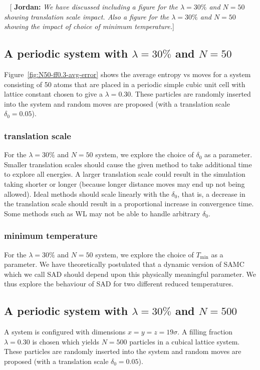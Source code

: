 \documentclass[letterpaper,twocolumn,amsmath,amssymb,pre,aps,10pt]{revtex4-1}
\newcommand{\blue}[1]{{\bf \color{blue} #1}}
\newcommand{\jpsays}[1]{{\color{red} [\blue{Jordan:} \emph{#1}]}}
\begin{document}
~\jpsays{We have discussed including a figure for the $\lambda = 30\%$ and $N = 50$
showing translation scale impact. Also a figure for the $\lambda = 30\%$ and $N = 50$
showing the impact of choice of minimum temperature.}

\subsection{A periodic system with $\lambda = 30\%$ and $N = 50$}

Figure~\ref{fig:N50-ff0.3-avg-error} shows the average entropy vs moves for
a system consisting of 50 atoms that are placed in a periodic simple cubic unit
cell with lattice constant chosen to give a $\lambda = 0.30$.  These particles
are randomly inserted into the system and random moves are proposed (with
a translation scale $\delta_0 = 0.05$).

\subsubsection{translation scale}
For the $\lambda = 30\%$ and $N = 50$ system, we explore the choice of $\delta_0$
as a parameter. Smaller translation scales should cause the given method to take
additional time to explore all energies.  A larger translation scale could result 
in the simulation taking shorter or longer (because longer distance moves may end up
not being allowed). Ideal methods should scale linearly with the $\delta_0$, that is,
a decrease in the translation scale should result in a proportional increase in convergence
time. Some methods such as WL may not be able to handle arbitrary $\delta_0$.

\subsubsection{minimum temperature}
For the $\lambda = 30\%$ and $N = 50$ system, we explore the choice of $T_{\min}$
as a parameter. We have theoretically postulated that a dynamic version of SAMC which
we call SAD should depend upon this physically meaningful parameter. We thus explore
the behaviour of SAD for two different reduced temperatures.

\subsection{A periodic system with $\lambda = 30\%$ and $N = 500$}

A system is configured with dimensions $x = y = z = 19\sigma$.  A
filling fraction $\lambda = 0.30$ is chosen which yields $N = 500$
particles in a cubical lattice system.  These particles are randomly inserted
into the system and random moves are proposed (with a translation scale
$\delta_0 = 0.05$).
\end{document}
